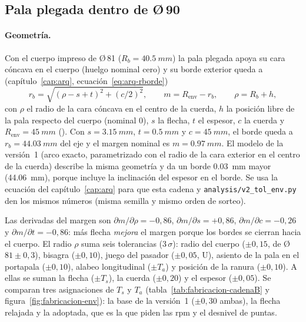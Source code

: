 \subsection{Pala plegada dentro de Ø\,90}\label{sec:fabricacion-cadenaB}

\paragraph{Geometría.} Con el cuerpo impreso de Ø\,81 ($R_b=\SI{40.5}{mm}$) la pala plegada apoya su cara
cóncava en el cuerpo (huelgo nominal cero) y su borde exterior queda a (capítulo~\ref{cap:arq},
ecuación~\eqref{eq:arq-rborde})
\begin{equation}
  r_b=\sqrt{(\rho-s+t)^2+(c/2)^2},\qquad m=R_{\text{env}}-r_b ,\qquad \rho=R_b+h ,
  \label{eq:fabricacion-borde}
\end{equation}
con $\rho$ el radio de la cara cóncava en el centro de la cuerda, $h$ la posición libre de la pala
respecto del cuerpo (nominal $0$), $s$ la flecha, $t$ el espesor, $c$ la cuerda y
$R_{\text{env}}=\SI{45}{mm}$ (). Con $s=\SI{3.15}{mm}$, $t=\SI{0.5}{mm}$ y $c=\SI{45}{mm}$, el borde
queda a $r_b=\SI{44.03}{mm}$ del eje y el margen nominal es $m=\SI{0.97}{mm}$. El modelo de la
versión~1 (arco exacto, parametrizado con el radio de la cara exterior en el centro de la cuerda)
describe la misma geometría y da un borde \SI{0.03}{mm} mayor (\SI{44.06}{mm}), porque incluye la
inclinación del espesor en el borde. Se usa la ecuación del capítulo~\ref{cap:arq} para que esta cadena y
\texttt{analysis/v2\_tol\_env.py} den los mismos números (misma semilla y mismo orden de sorteo).

Las derivadas del margen son $\partial m/\partial\rho=-0{,}86$, $\partial m/\partial s=+0{,}86$,
$\partial m/\partial c=-0{,}26$ y $\partial m/\partial t=-0{,}86$: más flecha \emph{mejora} el margen
porque los bordes se cierran hacia el cuerpo. El radio $\rho$ suma seis tolerancias (3\,$\sigma$): radio
del cuerpo ($\pm0{,}15$, de Ø\,$81\pm0{,}3$), bisagra ($\pm0{,}10$), juego del pasador ($\pm0{,}05$, U),
asiento de la pala en el portapala ($\pm0{,}10$), alabeo longitudinal ($\pm T_a$) y posición de la ranura
($\pm0{,}10$). A ellas se suman la flecha ($\pm T_s$), la cuerda ($\pm0{,}20$) y el espesor ($\pm0{,}05$).
Se comparan tres asignaciones de $T_s$ y $T_a$ (tabla~\ref{tab:fabricacion-cadenaB} y
figura~\ref{fig:fabricacion-env}): la base de la versión~1 ($\pm0{,}30$ ambas), la flecha relajada y la
adoptada, que es la que piden las rpm y el desnivel de puntas.


